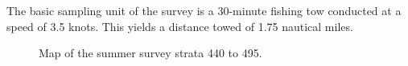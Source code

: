 \documentclass[12pt]{article}\usepackage[]{graphicx}\usepackage[]{color}
\begin{document}
The basic sampling unit of the survey is a 30-minute fishing tow conducted at a speed of 3.5 knots. This yields a distance towed of 1.75 nautical miles.


\begin{figure}[htb]

{\centering {} 

}

\caption{Map of the summer survey strata 440 to 495.}\label{fig:map2}
\end{figure}
\clearpage
\end{document}
